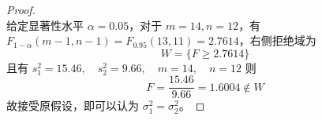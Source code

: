 \documentclass[normal,founder,mtpro2,cn]{elegantnote}
\begin{document}
\begin{enumerate}
\begin{proof}
\begin{equation*}
            \end{equation*}
            给定显著性水平 $\alpha=0.05$，对于 $m=14,n=12$，有 $F_{1-\alpha}(m-1,n-1)=F_{0.95}(13,11)=2.7614$，右侧拒绝域为
            \begin{equation*}
                W=\{F\geq 2.7614\}
            \end{equation*}
            且有 $s_{1}^{2}=15.46,\quad s_{2}^{2}=9.66,\quad m=14,\quad n=12$
            则
            \begin{equation*}
                F=\frac{15.46}{9.66}=1.6004\notin W
            \end{equation*}
            故接受原假设，即可以认为 $\sigma_{1}^{2}=\sigma_{2}^{2}$。
        \end{proof}
\end{enumerate}
\end{document}
